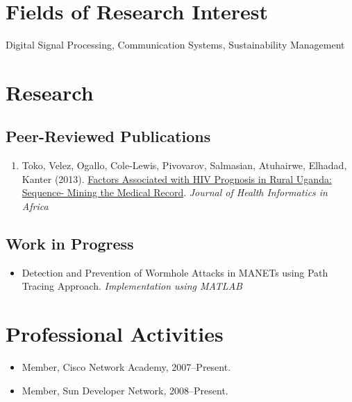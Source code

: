 \documentclass[12pt,a4paper]{article}
\begin{document}
\section*{Fields of Research Interest}

Digital Signal Processing, Communication Systems, Sustainability Management

\section*{Research}

\subsection*{Peer-Reviewed Publications}

\begin{enumerate}
\item Toko, Velez, Ogallo, Cole-Lewis, Pivovarov, Salmasian, Atuhairwe, Elhadad, Kanter (2013).
  \href{http://jblevins.org/research/lnlls}{Factors Associated with HIV Prognosis in Rural Uganda: Sequence-
Mining the Medical Record}.
  \textit{Journal of Health Informatics in Africa}
\end{enumerate}
\subsection*{Work in Progress}
  \begin{itemize}
    \item Detection and Prevention of Wormhole Attacks in MANETs using Path Tracing Approach. \textit{Implementation using MATLAB}
  \end{itemize}

\section*{Professional Activities}
\begin{itemize}
\item Member, Cisco Network Academy, 2007--Present.
\item Member, Sun Developer Network, 2008--Present.
\end{itemize}
\end{document}
